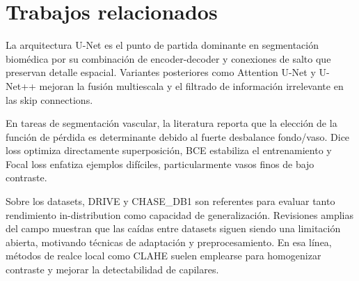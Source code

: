 \section{Trabajos relacionados}
La arquitectura U-Net \cite{ronneberger2015unet} es el punto de partida dominante en segmentación biomédica por su combinación de encoder-decoder y conexiones de salto que preservan detalle espacial. Variantes posteriores como Attention U-Net \cite{oktay2018attention} y U-Net++ \cite{zhou2019unetpp} mejoran la fusión multiescala y el filtrado de información irrelevante en las skip connections.

En tareas de segmentación vascular, la literatura reporta que la elección de la función de pérdida es determinante debido al fuerte desbalance fondo/vaso. Dice loss \cite{milletari2016vnet} optimiza directamente superposición, BCE estabiliza el entrenamiento y Focal loss \cite{lin2017focal} enfatiza ejemplos difíciles, particularmente vasos finos de bajo contraste.

Sobre los datasets, DRIVE \cite{staal2004drive} y CHASE\_DB1 son referentes para evaluar tanto rendimiento in-distribution como capacidad de generalización. Revisiones amplias del campo \cite{fraz2012retinal} muestran que las caídas entre datasets siguen siendo una limitación abierta, motivando técnicas de adaptación y preprocesamiento. En esa línea, métodos de realce local como CLAHE suelen emplearse para homogenizar contraste y mejorar la detectabilidad de capilares.
